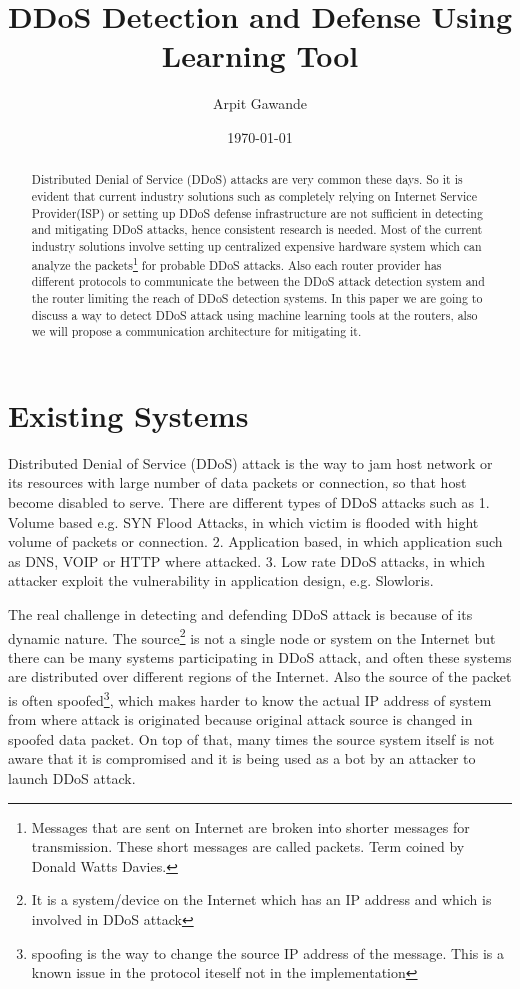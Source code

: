 \documentclass[10pt,oneside,a4paper]{article}
\author{Arpit Gawande}
\title{DDoS Detection and Defense Using Learning Tool}
\date{\today}
\begin{document}
\begin{abstract}
Distributed Denial of Service (DDoS) attacks are very common these days\cite{ddosattacknews}. So it is evident that current industry solutions such as completely relying on Internet Service Provider(ISP) or setting up DDoS defense infrastructure are not sufficient in detecting and mitigating DDoS attacks, hence consistent research is needed. Most of the current industry solutions involve setting up centralized expensive hardware system which can analyze the packets\footnote{Messages that are sent on Internet are broken into shorter messages for transmission. These short messages are called packets. Term coined by Donald Watts Davies.} \cite{networkdatapacket} for probable DDoS attacks. Also each router provider has different protocols to communicate the between the DDoS attack detection system and the router limiting the reach of DDoS detection systems. In this paper we are going to discuss a way to detect DDoS attack using machine learning tools at the routers, also we will propose a communication architecture for mitigating it.
\end{abstract}

\section{Existing Systems}

Distributed Denial of Service (DDoS) attack is the way to jam host network or its resources with large number of data packets or connection, so that host become disabled to serve. There are different types of DDoS attacks such as
1. Volume based e.g. SYN Flood Attacks, in which victim is flooded with hight volume of packets or connection.
2. Application based, in which application such as DNS, VOIP or HTTP where attacked.
3. Low rate DDoS attacks, in which attacker exploit the vulnerability in application design, e.g. Slowloris.
\cite{DDoSAttacks}

The real challenge in detecting and defending DDoS attack is because of its dynamic nature. The source\footnote{It is a system/device on the Internet which has an IP address and which is involved in DDoS attack} is not a single node or system on the Internet but there can be many systems participating in DDoS attack, and often these systems are distributed over different regions of the Internet. Also the source of the packet is often spoofed\footnote{spoofing is the way to change the source IP address of the message. This is a known issue in the protocol iteself not in the implementation}\cite{ipspoofing}, which makes harder to know the actual IP address of system from where attack is originated because original attack source is changed in spoofed data packet. On top of that, many times the source system itself is not aware that it is compromised and it is being used as a bot\cite{bot} by an attacker to launch DDoS attack.
\end{document}
